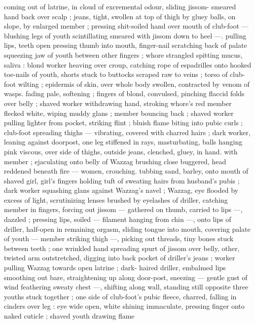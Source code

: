 {coming out of latrine, in cloud of excremental odour, sliding jissom- 
smeared hand back over scalp ; jeans, tight, swollen at top of thigh 
by gluey balls, on slope, by enlarged member ; pressing shit-soiled 
hand over mouth of club-foot --- blushing legs of youth scintillating 
smeared with jissom down to heel ---. pulling lips, teeth open 
pressing thumb into mouth, finger-nail scratching back of palate 
squeezing jaw of youth between other fingers ; whore strangled 
spitting mucus, saliva : blond worker heaving over croup, catching 
rope of espadrilles onto hooked toe-nails of youth, shorts stuck to 
buttocks scraped raw to veins ; torso of club-foot wilting ; epidermis 
of skin, over whole body swollen, contracted by venom of wasps. 
fading pale, softening ; fingers of blond, convulsed, pinching flaccid 
folds over belly ; shaved worker withdrawing hand, stroking whore's 
red member flecked white, wiping muddy glans ; member bouncing 
back ; shaved worker pulling lighter from pocket, striking flint ; bluish 
flame biting into pubic curls ; club-foot spreading thighs --- 
vibrating, covered with charred hairs ; dark worker, leaning against 
doorpost, one leg stiffened in rays, masturbating, balls hanging pink 
viscous, over side of thighs, outside jeans, clenched, gluey, in hand. 
with member ; ejaculating onto belly of Wazzag brushing close 
buggered, head reddened beneath fire --- women, crouching. 
tubbing sand, barley, onto mouth of shaved girl, girl's fingers 
holding tuft of sweating hairs from husband's pubis ; dark worker 
squashing glans against Wazzag's navel ; Wazzag, eye flooded by 
excess of light, scrutinizing lenses brushed by eyelashes of driller, 
catching member in fingers, forcing out jissom --- gathered on 
thumb, carried to lips ---, dazzled ; pressing lips, soiled --- filament 
hanging from chin ---, onto lips of driller, half-open in remaining 
orgasm, sliding tongue into mouth, covering palate of youth --- 
member striking thigh ---, picking out threads, tiny bones stuck 
between teeth ; one wrinkled hand spreading spurt of jissom over 
belly, other, twisted arm outstretched, digging into back pocket of 
driller's jeans ; worker pulling Wazzag towards open latrine ; dark- 
haired driller, embalmed lips smoothing out bare, straightening up 
along door-post, sneezing --- gentle gust of wind feathering sweaty 
chest ---, shifting along wall, standing still opposite three youths 
stuck together ; one side of club-foot's pubic fleece, charred, falling 
in cinders over leg : eye wide open, white shining immaculate, 
pressing finger onto naked cuticle ; shaved youth drawing flame 
}
